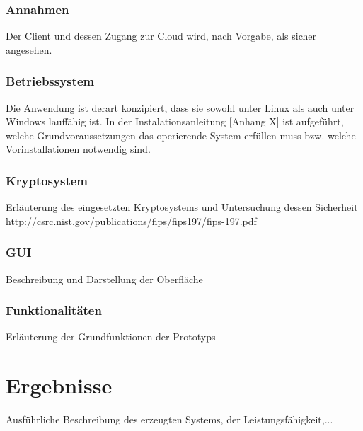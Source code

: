 \documentclass[12pt,a4paper,bibliography=totocnumbered,listof=totocnumbered]{scrartcl}
\begin{document}
\subsubsection{Annahmen}
Der Client und dessen Zugang zur Cloud wird, nach Vorgabe, als sicher angesehen.

\subsubsection{Betriebssystem}
Die Anwendung ist derart konzipiert, dass sie sowohl unter Linux als auch unter Windows lauffähig ist. In der Instalationsanleitung [Anhang X] ist aufgeführt, welche Grundvoraussetzungen das operierende System erfüllen muss bzw. welche Vorinstallationen notwendig sind.

\subsubsection{Kryptosystem}
Erläuterung des eingesetzten Kryptosystems und Untersuchung dessen Sicherheit\\
\url{http://csrc.nist.gov/publications/fips/fips197/fips-197.pdf}

\subsubsection{GUI}
Beschreibung und Darstellung der Oberfläche

\subsubsection{Funktionalitäten}
Erläuterung der Grundfunktionen der Prototyps

\pagebreak

\section{Ergebnisse}
Ausführliche Beschreibung des erzeugten Systems, der Leistungsfähigkeit,...

\pagebreak

\end{document}
